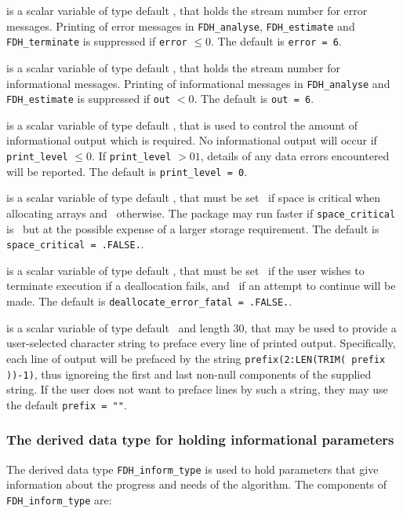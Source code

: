\documentclass{galahad}
\newcommand{\packagename}{FDH}
\begin{document}
\begin{description}

 is a scalar variable of type default \integer, that holds the
stream number for error messages. Printing of error messages in 
{\tt \packagename\_analyse},
{\tt \packagename\_estimate} 
and {\tt \packagename\_terminate} 
is suppressed if {\tt error} $\leq 0$.
The default is {\tt error = 6}.

 is a scalar variable of type default \integer, that holds the
stream number for informational messages. Printing of informational messages in 
{\tt \packagename\_analyse} and {\tt \packagename\_estimate} 
is suppressed if {\tt out} $< 0$.
The default is {\tt out = 6}.

 is a scalar variable of type default \integer, that is used
to control the amount of informational output which is required. No 
informational output will occur if {\tt print\_level} $\leq 0$. If 
{\tt print\_level} $> 01$, details of any data errors encountered 
will be reported.
The default is {\tt print\_level = 0}.

 is a scalar variable of type default \logical, 
that must be set \true\ if space is critical when allocating arrays
and  \false\ otherwise. The package may run faster if 
{\tt space\_critical} is \false\ but at the possible expense of a larger
storage requirement. The default is {\tt space\_critical = .FALSE.}.

 is a scalar variable of type default \logical, 
that must be set \true\ if the user wishes to terminate execution if
a deallocation  fails, and \false\ if an attempt to continue
will be made. The default is {\tt deallocate\_error\_fatal = .FALSE.}.

 is a scalar variable of type default \character\
and length 30, that may be used to provide a user-selected 
character string to preface every line of printed output. 
Specifically, each line of output will be prefaced by the string 
{\tt prefix(2:LEN(TRIM( prefix ))-1)},
thus ignoreing the first and last non-null components of the
supplied string. If the user does not want to preface lines by such
a string, they may use the default {\tt prefix = ""}.

\end{description}


\subsubsection{The derived data type for holding informational
 parameters}\label{typeinform}
The derived data type 
{\tt \packagename\_inform\_type} 
is used to hold parameters that give information about the progress and needs 
of the algorithm. The components of 
{\tt \packagename\_inform\_type} 
are:
\end{document}
